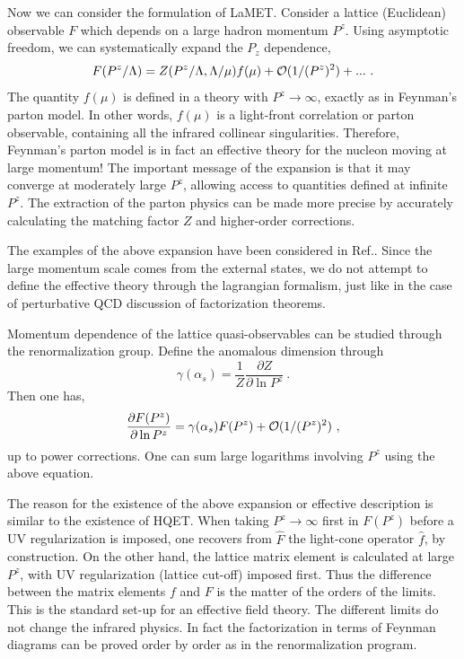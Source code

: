 Now we can consider the formulation of LaMET. Consider a lattice (Euclidean) observable $F$ which depends
on a large hadron momentum $P^z$. Using asymptotic freedom, we can systematically
expand the $P_z$ dependence,
\begin{equation}
             F(P^z/\Lambda) = Z(P^z/\Lambda, \Lambda/\mu)f(\mu) + {\cal O}(1/(P^z)^2)+ ... \ .
\label{Eq:Expansion}
\end{equation}
The quantity $f(\mu)$ is defined in a theory with $P^z\rightarrow \infty$, exactly
as in Feynman's parton model. In other words, $f(\mu)$ is a light-front correlation or parton observable,
containing all the infrared collinear singularities.
Therefore, Feynman's parton model is in fact an effective theory for the nucleon moving at large momentum!
The important message of the expansion is that it may converge at moderately large $P^z$, allowing
access to quantities defined at infinite $P^z$. The extraction of the parton physics
can be made more precise by accurately calculating the matching factor $Z$ and higher-order corrections.

The examples of the above expansion have been considered in Ref.\cite{Ji:2013dva, Ji:2013fga}.
Since the large momentum scale comes from the external states, we do not attempt to define
the effective theory through the lagrangian formalism, just like in the case of perturbative QCD
discussion of factorization theorems.


Momentum dependence of the lattice quasi-observables can be studied through the
renormalization group. Define the anomalous dimension through
\begin{equation}
            \gamma(\alpha_s) = \frac{1}{Z}\frac{\partial Z}{\partial \ln P^z} \ .
\end{equation}
Then one has,
\begin{equation}
            \frac{\partial F(P^z)}{\partial \ln P^z} = \gamma(\alpha_s) F(P^z) + {\cal O}(1/(P^z)^2) \ ,
\end{equation}
up to power corrections. One can sum large logarithms involving $P^z$ using the above equation.


The reason for the existence of the above expansion or effective description is similar to the
existence of HQET. When taking $P^z\rightarrow \infty$ first in $F(P^z)$ before a UV regularization is imposed,
one recovers from $\hat F$ the light-cone operator $\hat f$, by construction. On the other hand, the lattice matrix
element is calculated at large $P^z$, with UV regularization (lattice cut-off) imposed first. Thus the difference
between the matrix elements $f$ and $F$ is the matter of the orders of the limits. This is the standard set-up
for an effective field theory. The different limits do not change the infrared physics. In fact the
factorization in terms of Feynman diagrams can be proved order by order as in the renormalization program.

